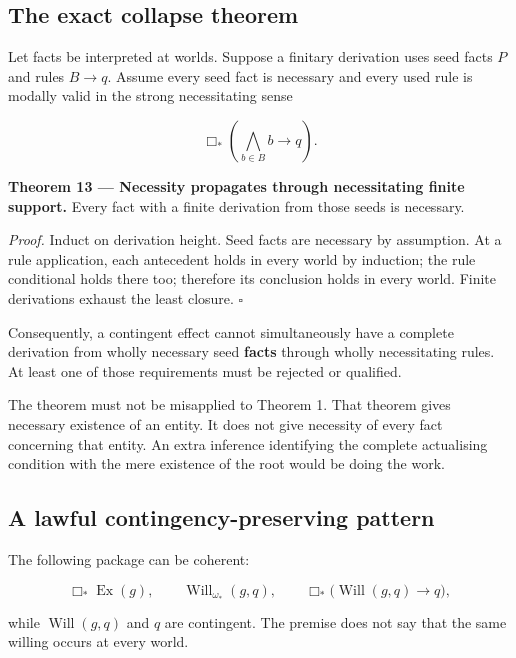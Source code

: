 \documentclass[11pt,a4paper]{article}
\begin{document}
\subsection{The exact collapse
theorem}\label{the-exact-collapse-theorem}

Let facts be interpreted at worlds. Suppose a finitary derivation uses
seed facts \(P\) and rules \(B\to q\). Assume every seed fact is
necessary and every used rule is modally valid in the strong
necessitating sense

\nopagebreak[4]

\[
\Box_*\left(\bigwedge_{b\in B}b\to q\right).
\]


\textbf{Theorem 13 --- Necessity propagates through necessitating finite
support.} Every fact with a finite derivation from those seeds is
necessary.

\emph{Proof.} Induct on derivation height. Seed facts are necessary by
assumption. At a rule application, each antecedent holds in every world
by induction; the rule conditional holds there too; therefore its
conclusion holds in every world. Finite derivations exhaust the least
closure. \(\square\)

Consequently, a contingent effect cannot simultaneously have a complete
derivation from wholly necessary seed \textbf{facts} through wholly
necessitating rules. At least one of those requirements must be rejected
or qualified.

The theorem must not be misapplied to Theorem 1. That theorem gives
necessary existence of an entity. It does not give necessity of every
fact concerning that entity. An extra inference identifying the complete
actualising condition with the mere existence of the root would be doing
the work.

\subsection{A lawful contingency-preserving
pattern}\label{a-lawful-contingency-preserving-pattern}

The following package can be coherent:

\nopagebreak[4]

\[
\Box_*\operatorname{Ex}(g),\qquad
\operatorname{Will}_{\omega_*}(g,q),\qquad
\Box_*\bigl(\operatorname{Will}(g,q)\to q\bigr),
\]

while \(\operatorname{Will}(g,q)\) and \(q\) are contingent. The premise
does not say that the same willing occurs at every world.
\end{document}
